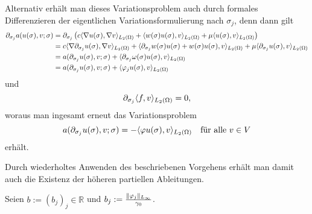 \begin{Satz}
\begin{Beweis}
        Alternativ erhält man dieses Variationsproblem auch durch formales Differenzieren der eigentlichen Variationsformulierung nach $\sigma_{j}$, denn dann gilt
        \begin{align}
            \partial_{\sigma_{j}} a(u(\sigma), v; \sigma)
            &= \partial_{\sigma_{j}} \left( c \skp{\grad u(\sigma)}{\grad v}{L_{2}(\Omega)} + \skp{w(\sigma)u(\sigma)}{v}{L_{2}(\Omega)} + \mu \skp{u(\sigma)}{v}{L_{2}(\Omega)} \right)
            \\&= c \skp{\grad \partial_{\sigma_{j}} u(\sigma)}{\grad v}{L_{2}(\Omega)} + \skp{ \partial_{\sigma_{j}} w(\sigma)u(\sigma) + w(\sigma) u(\sigma) }{v}{L_{2}(\Omega)} + \mu \skp{\partial_{\sigma_{j}}u(\sigma)}{v}{L_{2}(\Omega)}
            \\&= a(\partial_{\sigma_{j}} u(\sigma), v; \sigma) + \skp{\partial_{\sigma_{j}}\omega(\sigma)u(\sigma)}{v}{L_{2}(\Omega)}
            \\&= a(\partial_{\sigma_{j}} u(\sigma), v; \sigma) + \skp{\varphi_{j} u(\sigma)}{v}{L_{2}(\Omega)}
        \end{align}
        und
        \begin{equation}
            \partial_{\sigma_{j}} \skp{f}{v}{L_{2}(\Omega)} = 0,
        \end{equation}
        woraus man ingesamt erneut das Variationsproblem
        \begin{equation}
            a(\partial_{\sigma_{j}} u(\sigma), v; \sigma) = - \skp{\varphi u(\sigma)}{v}{L_{2}(\Omega)} \quad \fa v \in V
        \end{equation}
        erhält.

        Durch wiederholtes Anwenden des beschriebenen Vorgehens erhält man damit auch die Existenz der höheren partiellen Ableitungen.
    \end{Beweis}
\end{Satz}

Seien $b := (b_{j})_{j} \in \mathbb{R}$ und $b_{j} := \frac{\norm{\varphi_{j}}_{L_{\infty}}}{\gamma_{0}}$.

